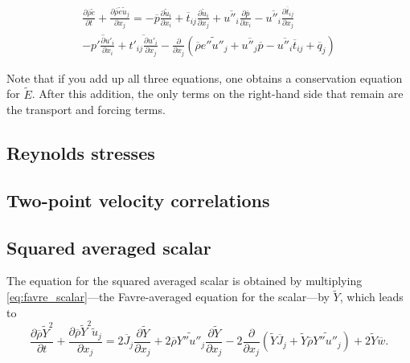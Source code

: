 \documentclass[oneside,a4paper,11pt]{report}
\newcommand{\rhoavg}{\overline{\rho}}
\newcommand{\pavg}{\overline{p}}
\newcommand{\qavg}{\overline{q}}
\newcommand{\tavg}{\overline{t}}
\newcommand{\wavg}{\overline{w}}
\newcommand{\Javg}{\overline{J}}
\newcommand{\pfluc}{p'}
\newcommand{\tfluc}{t'}
\newcommand{\ufluc}{u'}
\newcommand{\eavgf}{\widetilde{e}}
\newcommand{\uavgf}{\widetilde{u}}
\newcommand{\Eavgf}{\widetilde{E}}
\newcommand{\Yavgf}{\widetilde{Y}}
\newcommand{\eflucf}{e''}
\newcommand{\Yflucf}{Y''}
\newcommand{\uflucf}{u''}
\begin{document}
\begin{multline}
    \frac{\partial \rhoavg \eavgf}{\partial t} + \frac{\partial \rhoavg \eavgf \uavgf_j}{\partial x_j} = -\pavg \frac{\partial \uavgf_i}{\partial x_i} + \tavg_{ij} \frac{\partial \uavgf_i}{\partial x_j} + \overline{ \uflucf_i } \frac{\partial \pavg}{\partial x_i} - \overline{ \uflucf_i } \frac{\partial \tavg_{ij} }{\partial x_j} \\
    - \overline{ \pfluc \frac{\partial \ufluc_i}{\partial x_i} } + \overline{ \tfluc_{ij} \frac{\partial \ufluc_i}{\partial x_j} } - \frac{\partial}{\partial x_j} \left ( \rhoavg \widetilde{ \eflucf \uflucf_j }  +  \overline{ \uflucf_j } \pavg - \overline{ \uflucf_i } \tavg_{ij} + \qavg_j \right)
\end{multline}

Note that if you add up all three equations, one obtains a conservation equation for $\Eavgf$. After this addition, the only terms on the right-hand side that remain are the transport and forcing terms.
\subsection{Reynolds stresses}

\subsection{Two-point velocity correlations}

\subsection{Squared averaged scalar}
The equation for the squared averaged scalar is obtained by multiplying \cref{eq:favre_scalar}---the Favre-averaged equation for the scalar---by $\Yavgf$, which leads to
\begin{equation}
    \label{eq:squared_averaged_scalar_favre}
    \frac{\partial \rhoavg \Yavgf^2}{\partial t} + \frac{\partial \rhoavg \Yavgf^2 \uavgf_j}{\partial x_j} = 2 \Javg_j \frac{\partial \Yavgf}{\partial x_j} + 2 \rhoavg \widetilde{\Yflucf \uflucf_j} \frac{\partial \Yavgf}{\partial x_j} - 2\frac{\partial}{\partial x_j} \left ( \Yavgf \Javg_j + \Yavgf \rhoavg \widetilde{\Yflucf \uflucf_j} \right ) + 2 \Yavgf \wavg.
\end{equation}
\end{document}

